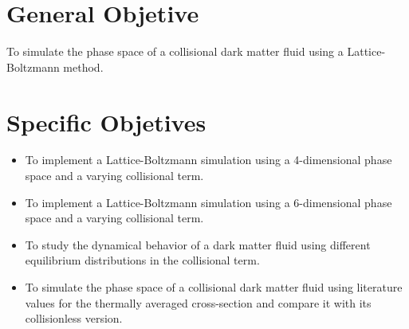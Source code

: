 \newpage
\renewcommand{\thepage}{\arabic{page}}%
\section{General Objetive}
To simulate the phase space of a collisional dark matter fluid using a Lattice-Boltzmann method.
\section{Specific Objetives}
\begin{itemize}
\item To implement a Lattice-Boltzmann simulation using a 4-dimensional phase space and a varying collisional term.
\item To implement a Lattice-Boltzmann simulation using a 6-dimensional phase space and a varying collisional term.
\item To study the dynamical behavior of a dark matter fluid using different equilibrium distributions in the collisional term.
\item To simulate the phase space of a collisional dark matter fluid using literature values for the thermally averaged cross-section and compare it with its collisionless version.
\end{itemize}